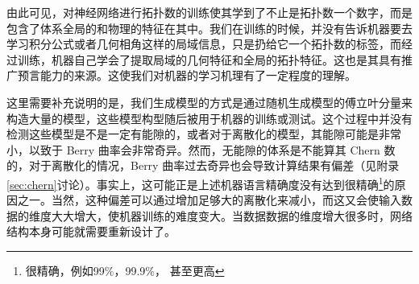 由此可见，对神经网络进行拓扑数的训练使其学到了不止是拓扑数一个数字，而是包含了体系全局的和物理的特征在其中。我们在训练的时候，并没有告诉机器要去学习积分公式或者几何相角这样的局域信息，只是扔给它一个拓扑数的标签，而经过训练，机器自己学会了提取局域的几何特征和全局的拓扑特征。这也是其具有推广预言能力的来源。这使我们对机器的学习机理有了一定程度的理解。

这里需要补充说明的是，我们生成模型的方式是通过随机生成模型的傅立叶分量来构造大量的模型，这些模型构型随后被用于机器的训练或测试。这个过程中并没有检测这些模型是不是一定有能隙的，或者对于离散化的模型，其能隙可能是非常小，以致于 Berry 曲率会非常奇异。然而，无能隙的体系是不能算其 Chern 数的，对于离散化的情况，Berry 曲率过去奇异也会导致计算结果有偏差（见附录\ref{sec:chern}讨论）。事实上，这可能正是上述机器语言精确度没有达到很精确\footnote{很精确，例如99\%，99.9\%， 甚至更高}的原因之一。当然，这种偏差可以通过增加足够大的离散化来减小，而这又会使输入数据的维度大大增大，使机器训练的难度变大。当数据数据的维度增大很多时，网络结构本身可能就需要重新设计了。



